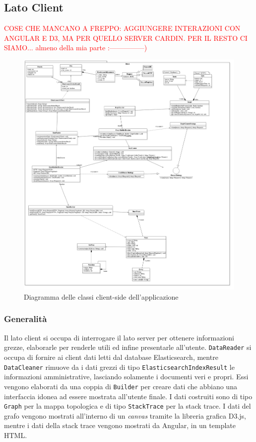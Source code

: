 
\subsection{Lato Client}

\textcolor{red}{COSE CHE MANCANO A FREPPO: AGGIUNGERE INTERAZIONI CON ANGULAR E D3, MA PER QUELLO SERVER CARDIN. PER IL RESTO CI SIAMO... almeno della mia parte :---------------)}

\begin{figure}[H]
    \centering
    \includegraphics[width=1\textwidth]{Images/classi.png}
    \caption{Diagramma delle classi client-side dell'applicazione}
    \label{img:diagrammaClassiClient}
\end{figure}

\subsubsection{Generalità}
Il lato client si occupa di interrogare il lato server per ottenere informazioni grezze, elaborarle per renderle utili ed infine presentarle all'utente. \texttt{DataReader} si occupa di fornire ai client dati letti dal database Elasticsearch, mentre \texttt{DataCleaner} rimuove da i dati grezzi di tipo \texttt{ElasticsearchIndexResult} le informazioni amministrative, lasciando solamente i documenti veri e propri. Essi vengono elaborati da una coppia di \texttt{Builder} per creare dati che abbiano una interfaccia idonea ad essere mostrata all'utente finale. I dati costruiti sono di tipo \texttt{Graph} per la mappa topologica e di tipo \texttt{StackTrace} per la stack trace. I dati del grafo vengono mostrati all'interno di un \emph{canvas} tramite la libreria grafica D3.js, mentre i dati della stack trace vengono mostrati da Angular, in un template HTML. 

